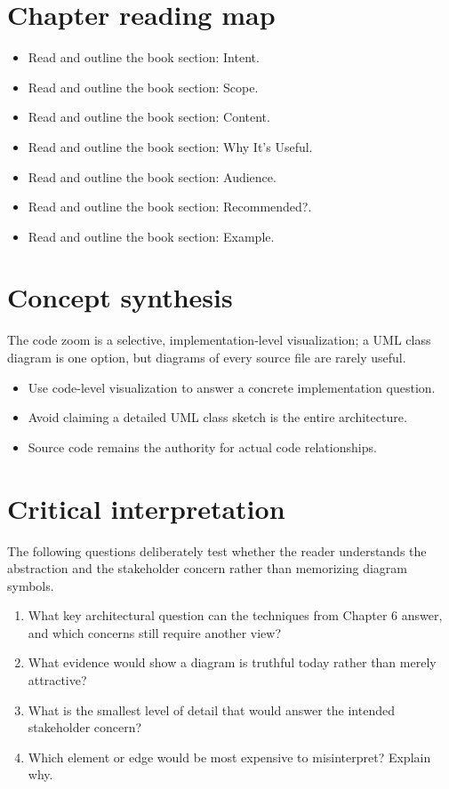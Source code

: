 \documentclass[10pt,letterpaper]{article}
\begin{document}
\section{Chapter reading map}
\begin{itemize}
\item Read and outline the book section: Intent.
\item Read and outline the book section: Scope.
\item Read and outline the book section: Content.
\item Read and outline the book section: Why It’s Useful.
\item Read and outline the book section: Audience.
\item Read and outline the book section: Recommended?.
\item Read and outline the book section: Example.
\end{itemize}

\section{Concept synthesis}
The code zoom is a selective, implementation-level visualization; a UML class diagram is one option, but diagrams of every source file are rarely useful.

\begin{itemize}
\item Use code-level visualization to answer a concrete implementation question.
\item Avoid claiming a detailed UML class sketch is the entire architecture.
\item Source code remains the authority for actual code relationships.
\end{itemize}

\section{Critical interpretation}
The following questions deliberately test whether the reader understands the abstraction and the stakeholder concern rather than memorizing diagram symbols.

\begin{enumerate}
\item What key architectural question can the techniques from Chapter 6 answer, and which concerns still require another view?
\item What evidence would show a diagram is truthful today rather than merely attractive?
\item What is the smallest level of detail that would answer the intended stakeholder concern?
\item Which element or edge would be most expensive to misinterpret? Explain why.
\end{enumerate}
\end{document}
